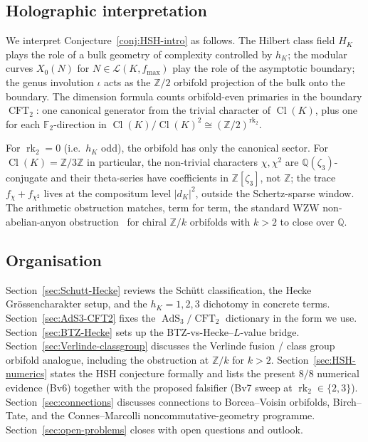 \documentclass[11pt,a4paper]{amsart}
\theoremstyle{definition}
\DeclareMathOperator{\Cl}{Cl}
\DeclareMathOperator{\rk}{rk}
\DeclareMathOperator{\AdS}{AdS}
\DeclareMathOperator{\CFT}{CFT}
\newcommand{\Q}{\mathbb{Q}}
\newcommand{\Z}{\mathbb{Z}}
\newcommand{\F}{\mathbb{F}}
\newcommand{\Lcal}{\mathcal{L}}
\newcommand{\rktwo}{\rk_{2}}
\begin{document}
\subsection{Holographic interpretation}\label{ss:intro-holo}

We interpret Conjecture~\ref{conj:HSH-intro} as follows. The Hilbert class field $H_K$
plays the role of a bulk geometry of complexity controlled by $h_K$; the modular curves
$X_0(N)$ for $N \in \Lcal(K, f_{\max})$ play the role of the asymptotic boundary; the
genus involution $\iota$ acts as the $\Z/2$ orbifold projection of the bulk onto the
boundary. The dimension formula counts orbifold-even primaries in the boundary $\CFT_2$:
one canonical generator from the trivial character of $\Cl(K)$, plus one for each
$\F_2$-direction in $\Cl(K)/\Cl(K)^2 \cong (\Z/2)^{\rktwo}$.

For $\rktwo = 0$ (i.e.\ $h_K$ odd), the orbifold has only the canonical sector. For
$\Cl(K) = \Z/3\Z$ in particular, the non-trivial characters $\chi, \chi^2$ are
$\Q(\zeta_3)$-conjugate and their theta-series have coefficients in $\Z[\zeta_3]$, not $\Z$;
the trace $f_\chi + f_{\chi^2}$ lives at the compositum level $|d_K|^2$, outside the
Schertz-sparse window. The arithmetic obstruction matches, term for term, the standard
WZW non-abelian-anyon obstruction~\cite{MooreSeiberg1989} for chiral $\Z/k$ orbifolds
with $k > 2$ to close over $\Q$.

\subsection{Organisation}\label{ss:intro-org}

Section~\ref{sec:Schutt-Hecke} reviews the Sch\"utt classification, the Hecke
Gr\"ossencharakter setup, and the $h_K = 1,2,3$ dichotomy in concrete terms.
Section~\ref{sec:AdS3-CFT2} fixes the $\AdS_3/\CFT_2$ dictionary in the form we use.
Section~\ref{sec:BTZ-Hecke} sets up the BTZ-vs-Hecke--$L$-value bridge.
Section~\ref{sec:Verlinde-classgroup} discusses the Verlinde fusion / class group orbifold
analogue, including the obstruction at $\Z/k$ for $k > 2$.
Section~\ref{sec:HSH-numerics} states the HSH conjecture formally and lists the present
$8/8$ numerical evidence (Bv6) together with the proposed falsifier (Bv7 sweep at
$\rktwo \in \{2,3\}$). Section~\ref{sec:connections} discusses connections to
Borcea--Voisin orbifolds, Birch--Tate, and the Connes--Marcolli noncommutative-geometry
programme. Section~\ref{sec:open-problems} closes with open questions and outlook.
\end{document}
